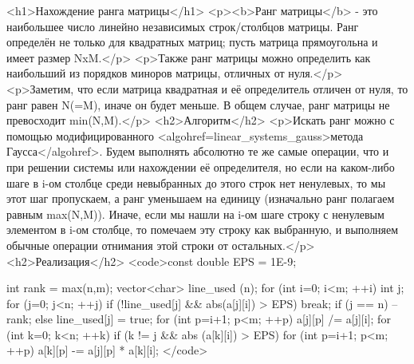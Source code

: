 <h1>Нахождение ранга матрицы</h1>
<p><b>Ранг матрицы</b> - это наибольшее число линейно независимых строк/столбцов матрицы. Ранг определён не только для квадратных матриц; пусть матрица прямоугольна и имеет размер NxM.</p>
<p>Также ранг матрицы можно определить как наибольший из порядков миноров матрицы, отличных от нуля.</p>
<p>Заметим, что если матрица квадратная и её определитель отличен от нуля, то ранг равен N(=M), иначе он будет меньше. В общем случае, ранг матрицы не превосходит min(N,M).</p>
<h2>Алгоритм</h2>
<p>Искать ранг можно с помощью модифицированного <algohref=linear_systems_gauss>метода Гаусса</algohref>. Будем выполнять абсолютно те же самые операции, что и при решении системы или нахождении её определителя, но если на каком-либо шаге в i-ом столбце среди невыбранных до этого строк нет ненулевых, то мы этот шаг пропускаем, а ранг уменьшаем на единицу (изначально ранг полагаем равным max(N,M)). Иначе, если мы нашли на i-ом шаге строку с ненулевым элементом в i-ом столбце, то помечаем эту строку как выбранную, и выполняем обычные операции отнимания этой строки от остальных.</p>
<h2>Реализация</h2>
<code>const double EPS = 1E-9;

int rank = max(n,m);
vector<char> line_used (n);
for (int i=0; i<m; ++i) {
	int j;
	for (j=0; j<n; ++j)
		if (!line_used[j] && abs(a[j][i]) > EPS)
			break;
	if (j == n)
		--rank;
	else {
		line_used[j] = true;
		for (int p=i+1; p<m; ++p)
			a[j][p] /= a[j][i];
		for (int k=0; k<n; ++k)
			if (k != j && abs (a[k][i]) > EPS)
				for (int p=i+1; p<m; ++p)
					a[k][p] -= a[j][p] * a[k][i];
	}
}</code>